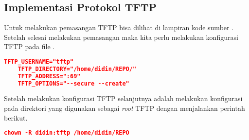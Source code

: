     	\subsection{Implementasi Protokol TFTP} 
    	Untuk melakukan pemasangan TFTP bisa dilihat di lampiran kode sumber .
    	Setelah selesai melakukan pemasangan maka kita perlu melakukan konfigurasi TFTP pada file .

	\begin{lstlisting}[frame=single,tabsize=2,breaklines,caption={Konfigurasi TFTP },label=nonrootuser, captionpos=b, language=json,numbers=none]
	TFTP_USERNAME="tftp"
	TFTP_DIRECTORY="/home/didin/REPO/"
	TFTP_ADDRESS=":69"
	TFTP_OPTIONS="--secure --create"
	\end{lstlisting}
        Setelah melakukan konfigurasi TFTP selanjutnya adalah melakukan konfigurasi pada direktori yang digunakan sebagai \textit{root} TFTP dengan menjalankan perintah berikut.
    \begin{lstlisting}[frame=single,tabsize=2,breaklines,caption={Konfigurasi direktori TFTP },label=nonrootuser, captionpos=b, language=json,numbers=none]
    chown -R didin:tftp /home/didin/REPO
    \end{lstlisting}
    
